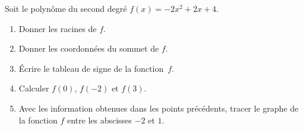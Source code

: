 
\begin{exercice}\label{exoPremiere-0097}

    Soit le polynôme du second degré \( f(x)=-2x^2+2x+4\).
    \begin{multicols}{2}
        \begin{enumerate}
            \item
                Donner les racines de \( f\).
            \item
                Donner les coordonnées du sommet de \( f\).
            \item
                Écrire le tableau de signe de la fonction~\( f\).
            \item
                Calculer \( f(0)\), \( f(-2)\) et \( f(3)\).
            \item
                Avec les information obtenues dans les points précédents, tracer le graphe de la fonction \( f\) entre les abscisses \( -2\) et \( 1\).
        \end{enumerate}
    \end{multicols}

\end{exercice}
